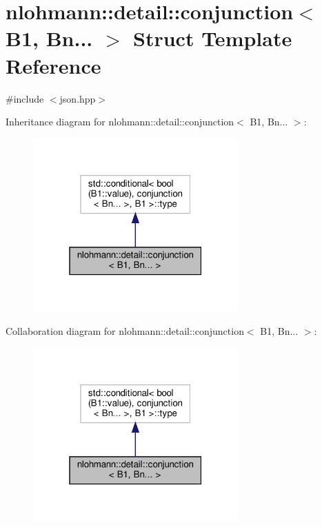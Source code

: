 \hypertarget{structnlohmann_1_1detail_1_1conjunction_3_01_b1_00_01_bn_8_8_8_01_4}{}\section{nlohmann\+:\+:detail\+:\+:conjunction$<$ B1, Bn... $>$ Struct Template Reference}
\label{structnlohmann_1_1detail_1_1conjunction_3_01_b1_00_01_bn_8_8_8_01_4}


{\ttfamily \#include $<$json.\+hpp$>$}



Inheritance diagram for nlohmann\+:\+:detail\+:\+:conjunction$<$ B1, Bn... $>$\+:
\nopagebreak
\begin{figure}[H]
\begin{center}
\leavevmode
\includegraphics[width=223pt]{structnlohmann_1_1detail_1_1conjunction_3_01_b1_00_01_bn_8_8_8_01_4__inherit__graph}
\end{center}
\end{figure}


Collaboration diagram for nlohmann\+:\+:detail\+:\+:conjunction$<$ B1, Bn... $>$\+:
\nopagebreak
\begin{figure}[H]
\begin{center}
\leavevmode
\includegraphics[width=223pt]{structnlohmann_1_1detail_1_1conjunction_3_01_b1_00_01_bn_8_8_8_01_4__coll__graph}
\end{center}
\end{figure}



